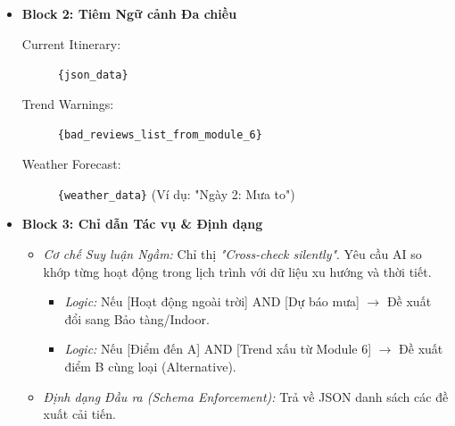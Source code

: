 \begin{itemize}
\begin{itemize}
        \item \textbf{Block 2: Tiêm Ngữ cảnh Đa chiều}
        \begin{description}
            \item[Current Itinerary:] \texttt{\{json\_data\}}
            \item[Trend Warnings:] \texttt{\{bad\_reviews\_list\_from\_module\_6\}}
            \item[Weather Forecast:] \texttt{\{weather\_data\}} (Ví dụ: "Ngày 2: Mưa to")
        \end{description}
        
        \item \textbf{Block 3: Chỉ dẫn Tác vụ \& Định dạng}
        \begin{itemize}
            \item \textit{Cơ chế Suy luận Ngầm:} Chỉ thị \textit{"Cross-check silently"}. Yêu cầu AI so khớp từng hoạt động trong lịch trình với dữ liệu xu hướng và thời tiết.
            \begin{itemize}
                \item \textit{Logic:} Nếu [Hoạt động ngoài trời] AND [Dự báo mưa] $\rightarrow$ Đề xuất đổi sang Bảo tàng/Indoor.
                \item \textit{Logic:} Nếu [Điểm đến A] AND [Trend xấu từ Module 6] $\rightarrow$ Đề xuất điểm B cùng loại (Alternative).
            \end{itemize}
            \item \textit{Định dạng Đầu ra (Schema Enforcement):} Trả về JSON danh sách các đề xuất cải tiến.
        \end{itemize}
    \end{itemize}
\end{itemize}
